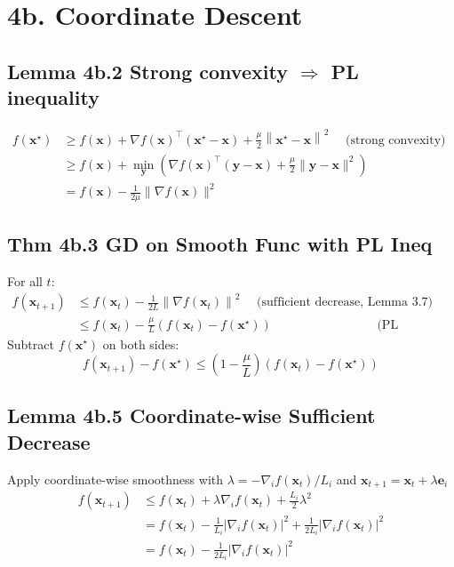 \section*{4b. Coordinate Descent}
\subsection*{Lemma 4b.2 Strong convexity $\Rightarrow$ PL inequality}

$$\begin{aligned} f\left(\mathbf{x}^{\star}\right) & \geq f(\mathbf{x})+\nabla f(\mathbf{x})^{\top}\left(\mathbf{x}^{\star}-\mathbf{x}\right)+\frac{\mu}{2}\left\|\mathbf{x}^{\star}-\mathbf{x}\right\|^{2} \quad \text { (strong convexity) } \\ & \geq f(\mathbf{x})+\min _{\mathbf{y}}\left(\nabla f(\mathbf{x})^{\top}(\mathbf{y}-\mathbf{x})+\frac{\mu}{2}\|\mathbf{y}-\mathbf{x}\|^{2}\right) \\ &=f(\mathbf{x})-\frac{1}{2 \mu}\|\nabla f(\mathbf{x})\|^{2} \end{aligned}$$


\subsection*{Thm 4b.3 GD on Smooth Func with PL Ineq}
For all $t$:
$$
\begin{array}{rlr}
f\left(\mathbf{x}_{t+1}\right) & \leq f\left(\mathbf{x}_{t}\right)-\frac{1}{2 L}\left\|\nabla f\left(\mathbf{x}_{t}\right)\right\|^{2} \quad \text { (sufficient decrease, Lemma 3.7) } \\
& \leq f\left(\mathbf{x}_{t}\right)-\frac{\mu}{L}\left(f\left(\mathbf{x}_{t}\right)-f\left(\mathbf{x}^{\star}\right)\right) & \text { (PL inequality) }
\end{array}
$$
Subtract $f\left(\mathbf{x}^{\star}\right)$ on both sides:
$$
f\left(\mathbf{x}_{t+1}\right)-f\left(\mathbf{x}^{\star}\right) \leq\left(1-\frac{\mu}{L}\right)\left(f\left(\mathbf{x}_{t}\right)-f\left(\mathbf{x}^{\star}\right)\right)
$$



\subsection*{Lemma 4b.5 Coordinate-wise Sufficient Decrease}
Apply coordinate-wise smoothness with $\lambda=-\nabla_{i} f\left(\mathbf{x}_{t}\right) / L_{i}$ and $\mathbf{x}_{t+1}=\mathbf{x}_{t}+\lambda \mathbf{e}_{i}$
$$
\begin{aligned}
f\left(\mathbf{x}_{t+1}\right) & \leq f\left(\mathbf{x}_{t}\right)+\lambda \nabla_{i} f\left(\mathbf{x}_{t}\right)+\frac{L_{i}}{2} \lambda^{2} \\
&=f\left(\mathbf{x}_{t}\right)-\frac{1}{L_{i}}\left|\nabla_{i} f\left(\mathbf{x}_{t}\right)\right|^{2}+\frac{1}{2 L_{i}}\left|\nabla_{i} f\left(\mathbf{x}_{t}\right)\right|^{2} \\
&=f\left(\mathbf{x}_{t}\right)-\frac{1}{2 L_{i}}\left|\nabla_{i} f\left(\mathbf{x}_{t}\right)\right|^{2}
\end{aligned}
$$





